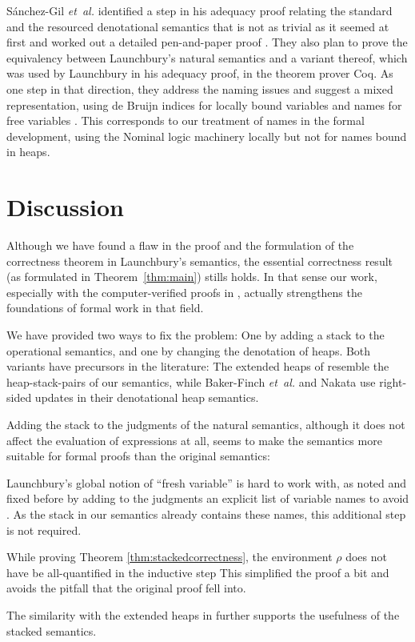 \documentclass{jfp1}
\theoremstyle{nonumberbreak}
\begin{document}
S{\'a}nchez-Gil {\em et~al.} identified a step in his adequacy proof relating the standard and the resourced denotational semantics that is not as trivial as it seemed at first and worked out a detailed pen-and-paper proof . They also plan to prove the equivalency between Launchbury’s natural semantics and a variant thereof, which was used by Launchbury in his adequacy proof, in the theorem prover Coq. As one step in that direction, they address the naming issues and suggest a mixed representation, using de Bruijn indices for locally bound variables and names for free variables . This corresponds to our treatment of names in the formal development, using the Nominal logic machinery \cite{nominal} locally but not for names bound in heaps.

\section{Discussion}

Although we have found a flaw in the proof and the formulation of the correctness theorem in Launchbury’s semantics, the essential correctness result (as formulated in Theorem~\ref{thm:main}) stills holds. In that sense our work, especially with the computer-verified proofs in \cite{afp}, actually strengthens the foundations of formal work in that field.

We have provided two ways to fix the problem: One by adding a stack to the operational semantics, and one by changing the denotation of heaps. Both variants have precursors in the literature: The extended heaps of \cite{distributed} resemble the heap-stack-pairs of our semantics, while Baker-Finch {\em et~al.}  and Nakata  use right-sided updates in their denotational heap semantics.

Adding the stack to the judgments of the natural semantics, although it does not affect the evaluation of expressions at all, seems to make the semantics more suitable for formal proofs than the original semantics:
\begin{compactitem}
\item Launchbury’s global notion of “fresh variable” is hard to work with, as noted and fixed before by adding to the judgments an explicit list of variable names to avoid \cite{sestoft}. As the stack in our semantics already contains these names, this additional step is not required.
\item While proving Theorem \ref{thm:stackedcorrectness}, the environment $\rho$ does not have be all-quantified in the inductive step This simplified the proof a bit and avoids the pitfall that the original proof fell into.
\end{compactitem}
The similarity with the extended heaps in \cite{distributed} further supports the usefulness of the stacked semantics.
\end{document}
